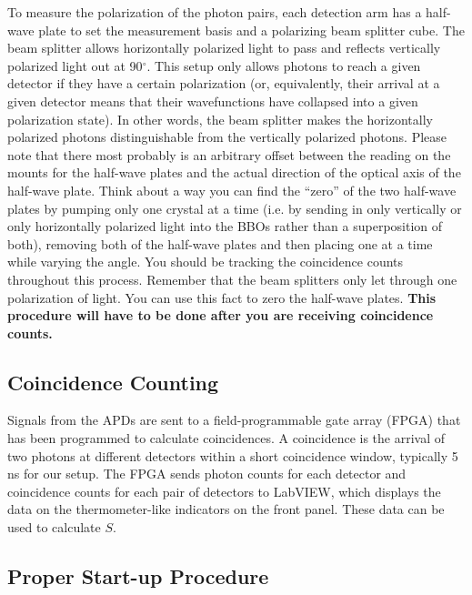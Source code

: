 \documentclass{../lab}
\begin{document}
To measure the polarization of the photon pairs, each detection arm has a half-wave plate to set the measurement basis and a polarizing beam splitter cube. The beam splitter allows horizontally polarized light to pass and reflects vertically polarized light out at 90$^\circ$. This setup only allows photons to reach a given detector if they have a certain polarization (or, equivalently, their arrival at a given detector means that their wavefunctions have collapsed into a given polarization state). In other words, the beam splitter makes the horizontally polarized photons distinguishable from the vertically polarized photons. Please note that there most probably is an arbitrary offset between the reading on the mounts for the half-wave plates and the actual direction of the optical axis of the half-wave plate. Think about a way you can find the ``zero'' of the two half-wave plates by pumping only one crystal at a time (i.e. by sending in only vertically or only horizontally polarized light into the BBOs rather than a superposition of both), removing both of the half-wave plates and then placing one at a time while varying the angle. You should be tracking the coincidence counts throughout this process. Remember that the beam splitters only let through one polarization of light. You can use this fact to zero the half-wave plates. \textbf{This procedure will have to be done after you are receiving coincidence counts. }

\subsection{Coincidence Counting}

Signals from the APDs are sent to a field-programmable gate array (FPGA) that has been programmed to calculate coincidences. A coincidence is the arrival of two photons at different detectors within a short coincidence window, typically 5 ns for our setup. The FPGA sends photon counts for each detector and coincidence counts for each pair of detectors to LabVIEW, which displays the data on the thermometer-like indicators on the front panel. These data can be used to calculate $S$.

\subsection{Proper Start-up Procedure}
\end{document}
